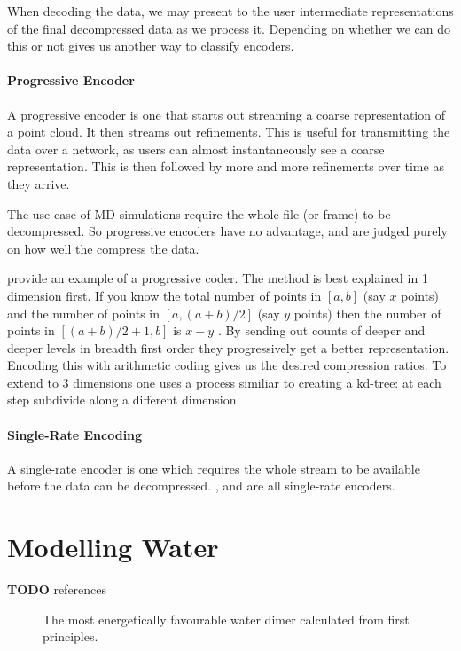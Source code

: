 \documentclass{report}
\newcommand{\todo}{\textbf{TODO} }
\begin{document}
When decoding the data, we may present to the user intermediate
representations of the final decompressed data as we process it. Depending on
whether we can do this or not gives us another way to classify encoders.

\paragraph{Progressive Encoder}
A progressive encoder is one that starts out streaming a coarse representation
of a point cloud. It then streams out refinements. This is useful for
transmitting the data over a network, as users can almost instantaneously see
a coarse representation. This is then followed by more and more refinements
over time as they arrive.

The use case of MD simulations require the whole file (or frame) to be
decompressed. So progressive encoders have no advantage, and are judged purely
on how well the compress the data.

\citet{devillers2000gci} provide an example of a progressive coder. The method
is best explained in 1 dimension first. If you know the total number of points
in $[a, b]$ (say $x$ points) and the number of points in $[a, (a+b)/2]$ (say
$y$ points) then the number of points in $[(a+b)/2+1, b]$ is $x - y$ . By
sending out counts of deeper and deeper levels in breadth first order they
progressively get a better representation. Encoding this with arithmetic
coding gives us the desired compression ratios. To extend to 3 dimensions one
uses a process similiar to creating a kd-tree: at each step subdivide along a
different dimension.

\paragraph{Single-Rate Encoding}
A single-rate encoder is one which requires the whole stream to be available
before the data can be decompressed. \citet{omeltchenko2000sls},
\citet{gumholdcomp} and \citet{merrycomp} are all single-rate encoders.


\section{Modelling Water}

\todo references

\begin{figure}[h]
\centering
{}
\caption{The most energetically favourable water dimer calculated from first
  principles.}
\label{fig:dimer}
\end{figure}
\end{document}
